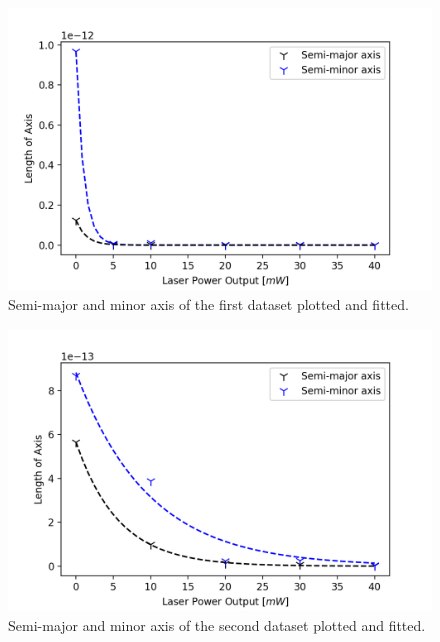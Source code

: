 \begin{minipage}{\linewidth}
    \centering
    \begin{minipage}[l]{0.45\linewidth}
        \begin{figure}[H]
            \centering
            \includegraphics[width=\linewidth]{figures/axis-dataset2.png}
            \caption{Semi-major and minor axis of the first dataset plotted and fitted.\\}
            \label{fig:spread-bead-plot}
        \end{figure}
    \end{minipage}
    \hspace{0.05\linewidth}
    \begin{minipage}[r]{0.45\linewidth}
        \begin{figure}[H]
            \centering
            \includegraphics[width=\linewidth]{figures/axis-dataset1.png}
            \caption{Semi-major and minor axis of the second dataset plotted and fitted.\\}
            \label{fig:spread-trap-plot}
        \end{figure}
    \end{minipage}

\end{minipage}